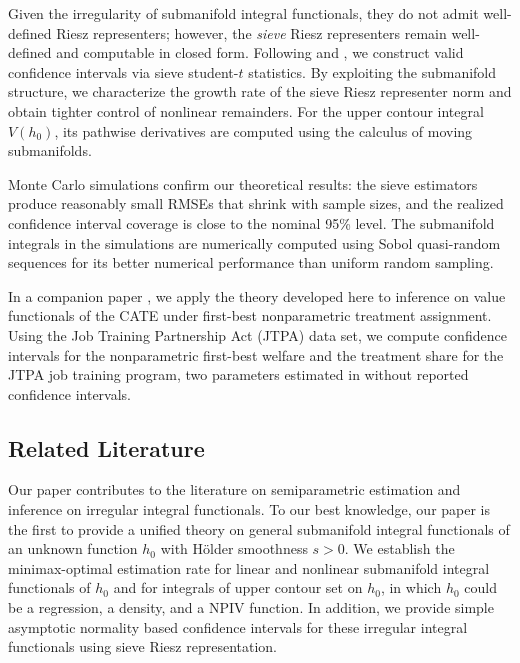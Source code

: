 \documentclass[12pt,american]{article}
\theoremstyle{definition}
\theoremstyle{plain}
\theoremstyle{definition}
\theoremstyle{plain}
\theoremstyle{plain}
\theoremstyle{plain}
\theoremstyle{plain}
\theoremstyle{plain}
\begin{document}
Given the irregularity of submanifold integral functionals, they do not admit well-defined Riesz representers; however, the \textit{sieve} Riesz representers remain well-defined and computable in closed form. Following \citet*{chen2014sieve,chen2014sieveM} and \cite*{chenpouzo2015sieve}, we construct valid confidence intervals via sieve student-$t$ statistics. By exploiting the submanifold structure, we characterize the growth rate of the sieve Riesz representer norm and obtain tighter control of nonlinear remainders. For the upper contour integral $V(h_0)$, its pathwise derivatives are computed using the calculus of moving submanifolds.

Monte Carlo simulations confirm our theoretical results: the sieve estimators produce reasonably small RMSEs that shrink with sample sizes, and the realized confidence interval coverage is close to the nominal 95\% level. The submanifold integrals in the simulations are numerically computed using Sobol quasi-random sequences \citep{sobol1967distribution} for its better numerical performance than uniform random sampling.  

In a companion paper \cite*{CCG2025}, we apply the theory developed here to inference on value functionals of the CATE under first-best nonparametric treatment assignment. Using the Job Training Partnership Act (JTPA) data set, we compute confidence intervals for the nonparametric  first-best welfare and the treatment share for the JTPA job training program, two parameters estimated in \cite{kitagawa2018should} without reported confidence intervals.


\subsection*{Related Literature}\label{sec:review}

Our paper contributes to the literature on semiparametric
estimation and inference on irregular integral functionals.
To our best knowledge, our paper is the first to
provide a unified theory on general
submanifold integral functionals of an unknown function $h_0$ with H\"{o}lder smoothness $s>0$. We establish the minimax-optimal estimation rate for linear and nonlinear submanifold integral functionals of $h_0$ and for integrals of upper contour set on $h_0$, in which $h_0$ could be a regression, a density, and a NPIV function. In addition, we provide simple asymptotic normality based confidence intervals for these irregular integral functionals using sieve Riesz representation.
\end{document}
